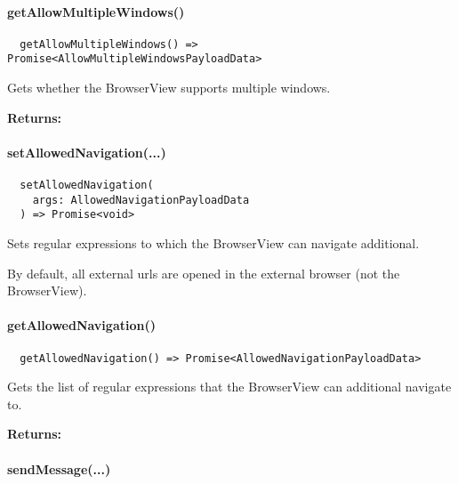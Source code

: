

\paragraph{getAllowMultipleWindows()}

\begin{verbatim}
  getAllowMultipleWindows() => Promise<AllowMultipleWindowsPayloadData>
\end{verbatim}

Gets whether the BrowserView supports multiple windows.

\textbf{Returns:} 


\paragraph{setAllowedNavigation(...)}

\begin{verbatim}
  setAllowedNavigation(
    args: AllowedNavigationPayloadData
  ) => Promise<void>
\end{verbatim}

Sets regular expressions to which the BrowserView can navigate additional.

By default, all external \acp{url} are opened in the external browser (not the BrowserView).


\paragraph{getAllowedNavigation()}

\begin{verbatim}
  getAllowedNavigation() => Promise<AllowedNavigationPayloadData>
\end{verbatim}

Gets the list of regular expressions that the BrowserView can additional navigate to.

\textbf{Returns:} 


\newpage

\paragraph{sendMessage(...)}

